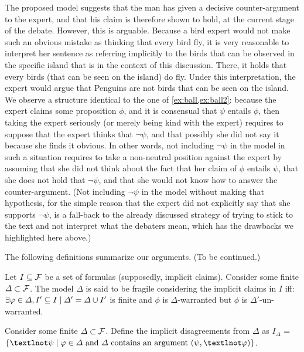\documentclass[version=3.21, pagesize, twoside=off, bibliography=totoc, DIV=calc, fontsize=12pt, a4paper, french, english]{scrartcl}
\begin{document}
The proposed model suggests that the man has given a decisive counter-argument to the expert, and that his claim is therefore shown to hold, at the current stage of the debate. However, this is arguable. Because a bird expert would not make such an obvious mistake as thinking that every bird fly, it is very reasonable to interpret her sentence as referring implicitly to the birds that can be observed in the specific island that is in the context of this discussion. There, it holds that every birds (that can be seen on the island) do fly. Under this interpretation, the expert would argue that Penguins are not birds that can be seen on the island. We observe a structure identical to the one of \cref{ex:ball,ex:ball2}: because the expert claims some proposition $\phi$, and it is consensual that $\psi$ entails $\phi$, then taking the expert seriously (or merely being kind with the expert) requires to suppose that the expert thinks that $¬\psi$, and that possibly she did not say it because she finds it obvious. In other words, not including $¬\psi$ in the model in such a situation requires to take a non-neutral position against the expert by assuming that she did not think about the fact that her claim of $\phi$ entails $\psi$, that she does not hold that $¬\psi$, and that she would not know how to answer the counter-argument. (Not including $¬\psi$ in the model without making that hypothesis, for the simple reason that the expert did not explicitly say that she supports $¬\psi$, is a fall-back to the already discussed strategy of trying to stick to the text and not interpret what the debaters mean, which has the drawbacks we highlighted here above.)

The following definitions summarize our arguments. (To be continued.)
\begin{definition}
	Let $I \subseteq \mathcal{F}$ be a set of formulas (supposedly, implicit claims). Consider some finite $\Delta \subset \mathcal{F}$. The model $\Delta$ is said to be fragile considering the implicit claims in $I$ iff: $\exists \phi \in \Delta, I' \subseteq I \suchthat \Delta' = \Delta \cup I'$ is finite and $\phi$ is $\Delta$-warranted but $\phi$ is $\Delta'$-un-warranted.
\end{definition}
\begin{definition}
	Consider some finite $\Delta \subset \mathcal{F}$. Define the implicit disagreements from $\Delta$ as $I_\Delta$ = $\set{¬\psi \suchthat \phi \in \Delta \text{ and } \Delta \text{ contains an argument } (\psi, ¬\phi)}$.
\end{definition}
\end{document}
